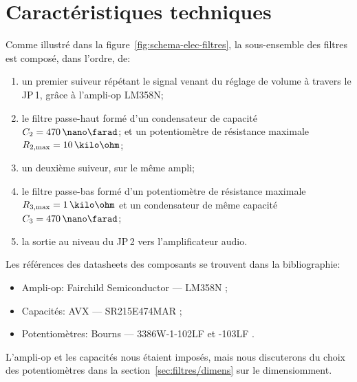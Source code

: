 \section{Caractéristiques techniques}
\label{sec:filtres/car-tech}

Comme illustré dans la figure~\ref{fig:schema-elec-filtres},
la sous-ensemble des filtres est composé, dans l'ordre, de:
\begin{enumerate}
    \item un premier suiveur répétant le signal venant du réglage de volume
        à travers le JP\,1, grâce à l'ampli-op LM358N;
    \item le filtre passe-haut formé d'un
        condensateur de capacité $C_2 = 470\,\nano\farad$;
        et un potentiomètre de résistance
        maximale $R\ind{2,max} = 10\,\kilo\ohm$;
    \item un deuxième suiveur, sur le même ampli;
    \item le filtre passe-bas formé d'un potentiomètre de résistance
        maximale $R\ind{3,max} = 1\,\kilo\ohm$
        et un condensateur de même capacité $C_3 = 470\,\nano\farad$;
    \item la sortie au niveau du JP\,2 vers l'amplificateur audio.
\end{enumerate}

Les références des datasheets des composants se trouvent dans la bibliographie:
\begin{itemize}
    \item Ampli-op: Fairchild Semiconductor --- LM358N \cite{datasheet-lm358n};
    \item Capacités: AVX --- SR215E474MAR \cite{datasheet-470nf};
    \item Potentiomètres: Bourns --- 3386W-1-102LF et -103LF \cite{datasheet-pot}.
\end{itemize}

L'ampli-op et les capacités nous étaient imposés,
mais nous discuterons du choix des potentiomètres dans
la section~\ref{sec:filtres/dimens} sur le dimensiomment.
